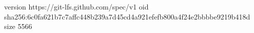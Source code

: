 version https://git-lfs.github.com/spec/v1
oid sha256:6c0fa621b7c7affc448b239a7d45cd4a921efefb800a4f24e2bbbbe9219b418d
size 5566
